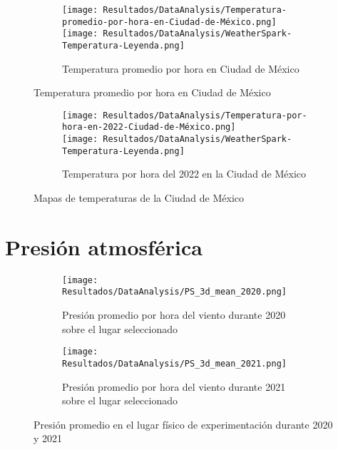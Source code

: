 			\begin{figure}[H]
				\centering
				\begin{subfigure}[t]{\linewidth}
					\centering
					\texttt{[image: Resultados/DataAnalysis/Temperatura-promedio-por-hora-en-Ciudad-de-México.png]}
					\\\texttt{[image: Resultados/DataAnalysis/WeatherSpark-Temperatura-Leyenda.png]}
					\caption{Temperatura promedio por hora en Ciudad de México}
					\label{fig:Temperatura-promedio-por-hora-en-Ciudad-de-México}
				\end{subfigure}
			\end{figure}
			\begin{figure}\ContinuedFloat
				\begin{subfigure}[t]{\linewidth}
					\centering
					\texttt{[image: Resultados/DataAnalysis/Temperatura-por-hora-en-2022-Ciudad-de-México.png]}\\
					\texttt{[image: Resultados/DataAnalysis/WeatherSpark-Temperatura-Leyenda.png]}
					\caption{Temperatura por hora del 2022 en la Ciudad de México}
					\label{fig:Temperatura-por-hora-en-2022-Ciudad-de-México}
				\end{subfigure}
				\caption{Mapas de temperaturas de la Ciudad de México}
				\label{fig:Temperatura-CDMX}
			\end{figure}
		
		\section{Presión atmosférica}
			
			\begin{figure}[H]
				\centering
				\begin{subfigure}[t]{0.45\linewidth}
					\centering
					\texttt{[image: Resultados/DataAnalysis/PS\_3d\_mean\_2020.png]}
					\caption{Presión promedio por hora del viento durante 2020 sobre el lugar seleccionado}
					\label{fig:PS_3d_mean_2020}
				\end{subfigure}
				\hfill
				\begin{subfigure}[t]{0.45\linewidth}
					\centering
					\texttt{[image: Resultados/DataAnalysis/PS\_3d\_mean\_2021.png]}
					\caption{Presión promedio por hora del viento durante 2021 sobre el lugar seleccionado}
					\label{fig:PS_3d_mean_2021}
				\end{subfigure}
				\caption{Presión promedio en el lugar físico de experimentación durante 2020 y 2021}
				\label{fig:PS_3d_mean}
			\end{figure}
			
